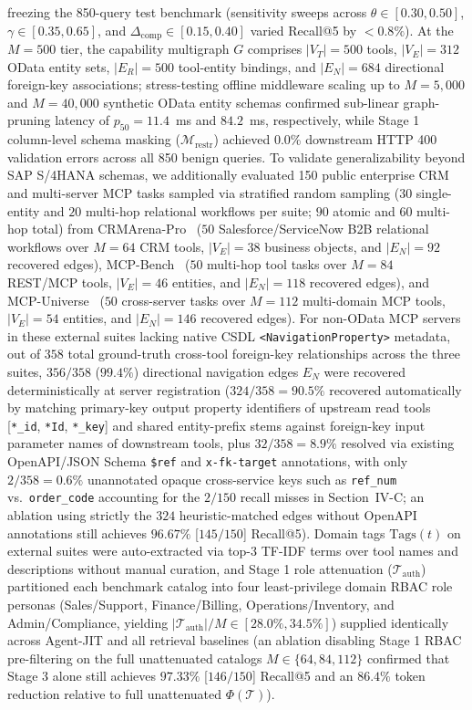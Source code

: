\documentclass[conference,10pt]{IEEEtran}
\begin{document}
\begin{enumerate}
freezing the 850-query test benchmark (sensitivity sweeps across $\theta \in [0.30, 0.50]$, $\gamma \in [0.35, 0.65]$, and $\Delta_{\text{comp}} \in [0.15, 0.40]$ varied Recall@5 by $< 0.8\%$). At the $M = 500$ tier, the capability multigraph $G$ comprises $|V_T| = 500$ tools, $|V_E| = 312$ OData entity sets, $|E_R| = 500$ tool-entity bindings, and $|E_N| = 684$ directional foreign-key associations; stress-testing offline middleware scaling up to $M = 5{,}000$ and $M = 40{,}000$ synthetic OData entity schemas confirmed sub-linear graph-pruning latency of $p_{50} = 11.4$~ms and $84.2$~ms, respectively, while Stage 1 column-level schema masking ($\mathcal{M}_{\text{restr}}$) achieved 0.0\% downstream HTTP 400 validation errors across all 850 benign queries. To validate generalizability beyond SAP S/4HANA schemas, we additionally evaluated 150 public enterprise CRM and multi-server MCP tasks sampled via stratified random sampling ($30$ single-entity and $20$ multi-hop relational workflows per suite; $90$ atomic and $60$ multi-hop total) from CRMArena-Pro~\cite{huang2025crmarena} ($50$ Salesforce/ServiceNow B2B relational workflows over $M = 64$ CRM tools, $|V_E| = 38$ business objects, and $|E_N| = 92$ recovered edges), MCP-Bench~\cite{wang2025mcpbench} ($50$ multi-hop tool tasks over $M = 84$ REST/MCP tools, $|V_E| = 46$ entities, and $|E_N| = 118$ recovered edges), and MCP-Universe~\cite{luo2025mcpuniverse} ($50$ cross-server tasks over $M = 112$ multi-domain MCP tools, $|V_E| = 54$ entities, and $|E_N| = 146$ recovered edges). For non-OData MCP servers in these external suites lacking native CSDL \texttt{<NavigationProperty>} metadata, out of $358$ total ground-truth cross-tool foreign-key relationships across the three suites, $356/358$ ($99.4\%$) directional navigation edges $E_N$ were recovered deterministically at server registration ($324/358 = 90.5\%$ recovered automatically by matching primary-key output property identifiers of upstream read tools [\texttt{*\_id}, \texttt{*Id}, \texttt{*\_key}] and shared entity-prefix stems against foreign-key input parameter names of downstream tools, plus $32/358 = 8.9\%$ resolved via existing OpenAPI/JSON Schema \texttt{\$ref} and \texttt{x-fk-target} annotations, with only $2/358 = 0.6\%$ unannotated opaque cross-service keys such as \texttt{ref\_num} vs.\ \texttt{order\_code} accounting for the $2/150$ recall misses in Section~IV-C; an ablation using strictly the $324$ heuristic-matched edges without OpenAPI annotations still achieves $96.67\%$ [$145/150$] Recall@5). Domain tags $\text{Tags}(t)$ on external suites were auto-extracted via top-3 TF-IDF terms over tool names and descriptions without manual curation, and Stage 1 role attenuation ($\mathcal{T}_{\text{auth}}$) partitioned each benchmark catalog into four least-privilege domain RBAC role personas (Sales/Support, Finance/Billing, Operations/Inventory, and Admin/Compliance, yielding $|\mathcal{T}_{\text{auth}}| / M \in [28.0\%, 34.5\%]$) supplied identically across Agent-JIT and all retrieval baselines (an ablation disabling Stage 1 RBAC pre-filtering on the full unattenuated catalogs $M \in \{64, 84, 112\}$ confirmed that Stage 3 alone still achieves $97.33\%$ [$146/150$] Recall@5 and an $86.4\%$ token reduction relative to full unattenuated $\Phi(\mathcal{T})$).

\end{enumerate}
\end{document}
